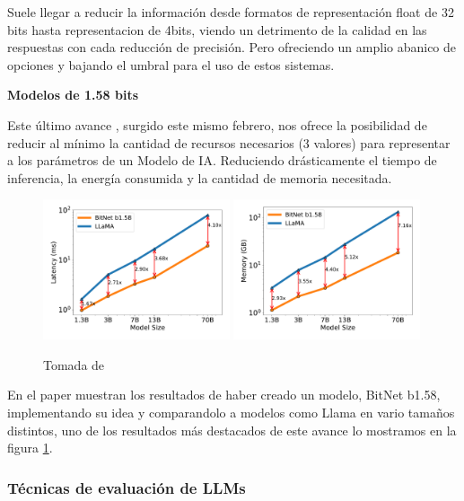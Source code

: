 Suele llegar a reducir la información desde formatos de representación float de 32 bits hasta representacion de 4bits, viendo un detrimento de la calidad en las respuestas con cada reducción de precisión. Pero ofreciendo un amplio abanico de opciones y bajando el umbral para el uso de estos sistemas.

\textbf{Modelos de 1.58 bits}

Este último avance \cite{ma2024era}, surgido este mismo febrero, nos ofrece la posibilidad de reducir al mínimo la cantidad de recursos necesarios (3 valores) para representar a los parámetros de un Modelo de IA. Reduciendo drásticamente el tiempo de inferencia, la energía consumida y la cantidad de memoria necesitada.

\begin{figure}[thb]
    \centering
    \includegraphics[width=0.49\textwidth]{Imagenes/Vectorial/plot-latencia.pdf}
    \includegraphics[width=0.49\textwidth]{Imagenes/Vectorial/plot-memoria.pdf}
    \caption{Tomada de \cite{ma2024era}}
    \label{fig:latencia-memoria}
\end{figure}

En el paper muestran los resultados de haber creado un modelo, BitNet b1.58, implementando su idea y comparandolo a modelos como Llama en vario tamaños distintos, uno de los resultados más destacados de este avance lo mostramos en la figura \ref{fig:latencia-memoria}.

\subsubsection{Técnicas de evaluación de LLMs}
\label{section:2344}

